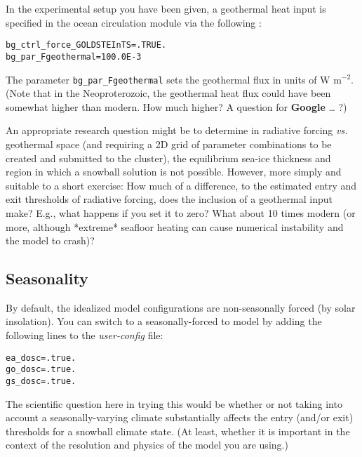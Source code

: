 \documentclass[11pt,fleqn]{book} %
\begin{document}
In the experimental setup you have been given, a geothermal heat input is specified in the ocean circulation module via the following :

\vspace{-2mm}
\begin{verbatim}
bg_ctrl_force_GOLDSTEInTS=.TRUE.
bg_par_Fgeothermal=100.0E-3
\end{verbatim}
\vspace{-2mm}

The parameter \texttt{bg\_par\_Fgeothermal} sets the geothermal flux in units of W m$^{-2}$. (Note that in the Neoproterozoic, the geothermal heat flux could have been somewhat higher than modern. How much higher? A question for \textbf{Google} … ?)

An appropriate research question might be to determine in radiative forcing \textit{vs.} geothermal space (and requiring a 2D grid of parameter combinations to be created and submitted to the cluster), the equilibrium sea-ice thickness and region in which a snowball solution is not possible. However, more simply and suitable to a short exercise: How much of a difference, to the estimated entry and exit thresholds of radiative forcing, does the inclusion of a geothermal input make? E.g., what happens if you set it to zero? What about 10 times modern (or more, although *extreme* seafloor heating can cause numerical instability and the model to crash)?


\subsection{Seasonality}

By default, the idealized model configurations are non-seasonally forced (by solar insolation). You can switch to a seasonally-forced to model by adding the following lines to the \textit{user-config} file: 

\vspace{-3mm}
\begin{verbatim}
ea_dosc=.true.
go_dosc=.true.
gs_dosc=.true.
\end{verbatim}
\vspace{-2mm}

The scientific question here in trying this would be whether or not taking into account a seasonally-varying climate substantially affects the entry (and/or exit) thresholds for a snowball climate state. (At least, whether it is important in the context of the resolution and physics of the model you are using.)
\end{document}
